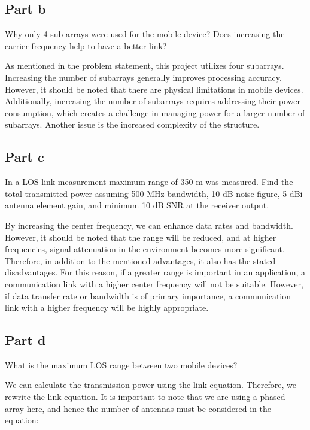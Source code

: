 \documentclass[12pt,onecolumn,a4paper]{article}
\begin{document}
\subsection{Part b}

{\color{questioncolor}

Why only 4 sub-arrays were used for the mobile device? Does increasing the carrier frequency help to have a better link?\\
}

As mentioned in the problem statement, this project utilizes four subarrays. Increasing the number of subarrays generally improves processing accuracy. However, it should be noted that there are physical limitations in mobile devices. Additionally, increasing the number of subarrays requires addressing their power consumption, which creates a challenge in managing power for a larger number of subarrays. Another issue is the increased complexity of the structure.




\subsection{Part c}

{\color{questioncolor}
In a LOS link measurement maximum range of 350 m was measured. Find the total transmitted power assuming 500 MHz bandwidth, 10 dB noise figure, 5 dBi antenna element gain, and minimum  10 dB SNR at the receiver output.\\
}

By increasing the center frequency, we can enhance data rates and bandwidth. However, it should be noted that the range will be reduced, and at higher frequencies, signal attenuation in the environment becomes more significant. Therefore, in addition to the mentioned advantages, it also has the stated disadvantages. For this reason, if a greater range is important in an application, a communication link with a higher center frequency will not be suitable. However, if data transfer rate or bandwidth is of primary importance, a communication link with a higher frequency will be highly appropriate.

\subsection{Part d}
{\color{questioncolor}
What is the maximum LOS range between two mobile devices?\\
}

We can calculate the transmission power using the link equation. Therefore, we rewrite the link equation. It is important to note that we are using a phased array here, and hence the number of antennas must be considered in the equation:
\end{document}
